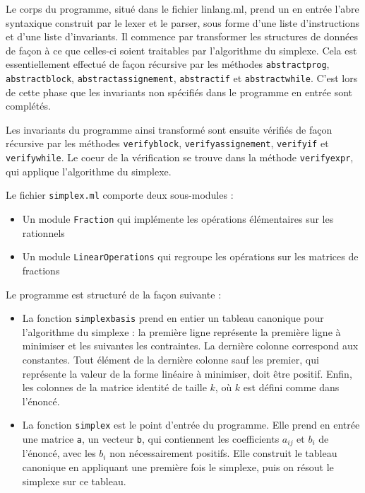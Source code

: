 \documentclass[a4paper]{article}
\begin{document}
Le corps du programme, situé dans le fichier linlang.ml, prend un en entrée l'abre syntaxique construit par le lexer et le parser, sous forme d'une liste d'instructions et d'une liste d'invariants. Il commence par transformer les structures de données de façon à ce que celles-ci soient traitables par l'algorithme du simplexe. Cela est essentiellement effectué de façon récursive par les méthodes \texttt{abstract\textunderscore prog}, \texttt{abstract\textunderscore block}, \texttt{abstract\textunderscore assignement}, \texttt{abstract\textunderscore if} et \texttt{abstract\textunderscore while}. C'est lors de cette phase que les invariants non spécifiés dans le programme en entrée sont complétés.

Les invariants du programme ainsi transformé sont ensuite vérifiés de façon récursive par les méthodes \texttt{verify\textunderscore block}, \texttt{verify\textunderscore assignement}, \texttt{verify\textunderscore if} et \texttt{verify\textunderscore while}. Le coeur de la vérification se trouve dans la méthode \texttt{verify\textunderscore expr}, qui applique l'algorithme du simplexe.

Le fichier \texttt{simplex.ml} comporte deux sous-modules :

\begin{itemize}
  \item Un module \texttt{Fraction} qui implémente les opérations élémentaires sur les rationnels
  \item Un module \texttt{LinearOperations} qui regroupe les opérations sur les matrices de fractions
\end{itemize}

Le programme est structuré de la façon suivante :

\begin{itemize}
  \item La fonction \texttt{simplex\textunderscore basis} prend en entier un tableau canonique pour l'algorithme du simplexe : la première ligne représente la première ligne à minimiser et les suivantes les contraintes. La dernière colonne correspond aux constantes. Tout élément de la dernière colonne sauf les premier, qui représente la valeur de la forme linéaire à minimiser, doit être positif. Enfin, les colonnes de la matrice identité de taille $k$, où $k$ est défini comme dans l'énoncé.
  \item La fonction \texttt{simplex} est le point d'entrée du programme. Elle prend en entrée une matrice \texttt{a}, un vecteur \texttt{b}, qui contiennent les coefficients $a_{ij}$ et $b_i$ de l'énoncé, avec les $b_i$ non nécessairement positifs. Elle construit le tableau canonique en appliquant une première fois le simplexe, puis on résout le simplexe sur ce tableau.
\end{itemize}
\end{document}
